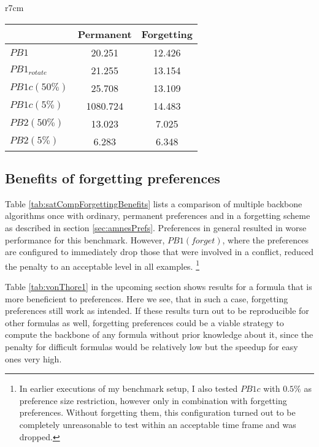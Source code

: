 

\begin{wraptable}[14]{r}{7cm} %
\begin{tabular}{l| c c }
 & Permanent & Forgetting  \\
\hline
$PB1$ &	20.251 & 12.426 \\
$PB1_{rotate}$ & 21.255 & 13.154 \\
$PB1c(50\%)$ & 25.708 & 13.109 \\
$PB1c(5\%)$ & 1080.724 & 14.483 \\
$PB2(50\%)$ & 13.023 & 7.025 \\
$PB2(5\%)$ & 6.283 & 6.348 \\
\end{tabular}
\caption{Average of the complete backbone computation for variants of $PrefBones$ with and without forgetting preferences.}
\label{tab:satCompForgettingBenefits}
\end{wraptable}


\subsection{Benefits of forgetting preferences}
Table \ref{tab:satCompForgettingBenefits}
lists a comparison of multiple backbone algorithms once with ordinary, permanent preferences and in a forgetting scheme as described in section \ref{sec:amnesPrefs}. Preferences in general resulted in worse performance for this benchmark. However, $PB1(forget)$, where the preferences are configured to immediately drop those that were involved in a conflict, reduced the penalty to an acceptable level in all examples. \footnote{
In earlier executions of my benchmark setup, I also tested $PB1c$ with $0.5\%$ as preference size restriction, however only in combination with forgetting preferences. Without forgetting them, this configuration turned out to be completely unreasonable to test within an acceptable time frame and was dropped.}


Table \ref{tab:vonThore1} in the upcoming section shows results for a formula that is more beneficient to preferences. Here we see, that in such a case, forgetting preferences still work as intended. If these results turn out to be reproducible for other formulas as well, forgetting preferences could be a viable strategy to compute the backbone of any formula without prior knowledge about it, since the penalty for difficult formulas would be relatively low but the speedup for easy ones very high.


